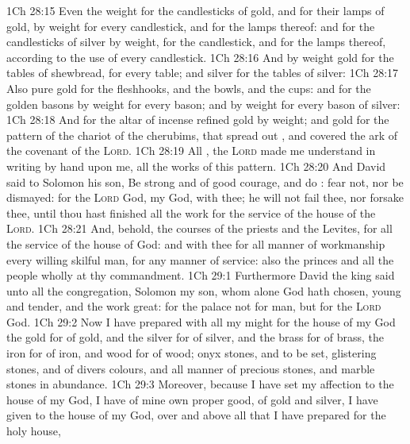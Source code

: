 \vs 1Ch 28:15 Even the weight for the candlesticks of gold, and for their lamps of gold, by weight for every candlestick, and for the lamps thereof: and for the candlesticks of silver by weight,  for the candlestick, and  for the lamps thereof, according to the use of every candlestick.
\vs 1Ch 28:16 And by weight  gold for the tables of shewbread, for every table; and  silver for the tables of silver:
\vs 1Ch 28:17 Also pure gold for the fleshhooks, and the bowls, and the cups: and for the golden basons  by weight for every bason; and  by weight for every bason of silver:
\vs 1Ch 28:18 And for the altar of incense refined gold by weight; and gold for the pattern of the chariot of the cherubims, that spread out , and covered the ark of the covenant of the \textsc{Lord}.
\vs 1Ch 28:19 All , the \textsc{Lord} made me understand in writing by  hand upon me,  all the works of this pattern.
\vs 1Ch 28:20 And David said to Solomon his son, Be strong and of good courage, and do : fear not, nor be dismayed: for the \textsc{Lord} God,  my God,  with thee; he will not fail thee, nor forsake thee, until thou hast finished all the work for the service of the house of the \textsc{Lord}.
\vs 1Ch 28:21 And, behold, the courses of the priests and the Levites,  for all the service of the house of God: and  with thee for all manner of workmanship every willing skilful man, for any manner of service: also the princes and all the people  wholly at thy commandment.
\vs 1Ch 29:1 Furthermore David the king said unto all the congregation, Solomon my son, whom alone God hath chosen,  young and tender, and the work  great: for the palace  not for man, but for the \textsc{Lord} God.
\vs 1Ch 29:2 Now I have prepared with all my might for the house of my God the gold for  of gold, and the silver for  of silver, and the brass for  of brass, the iron for  of iron, and wood for  of wood; onyx stones, and  to be set, glistering stones, and of divers colours, and all manner of precious stones, and marble stones in abundance.
\vs 1Ch 29:3 Moreover, because I have set my affection to the house of my God, I have of mine own proper good, of gold and silver,  I have given to the house of my God, over and above all that I have prepared for the holy house,
